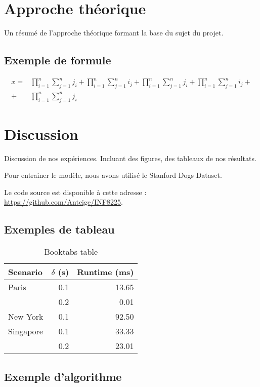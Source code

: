 \documentclass{article}
\begin{document}
\section{Approche théorique}
Un résumé de l'approche théorique formant la base du sujet du projet.

\subsection{Exemple de formule}

\begin{align}
    x =& \prod_{i=1}^n \sum_{j=1}^n j_i + \prod_{i=1}^n \sum_{j=1}^n i_j + \prod_{i=1}^n \sum_{j=1}^n j_i + \prod_{i=1}^n \sum_{j=1}^n i_j + \nonumber\\
    + & \prod_{i=1}^n \sum_{j=1}^n j_i
\end{align}

\section{Discussion}

Discussion de nos expériences. Incluant des figures, des tableaux de nos résultats.

Pour entrainer le modèle, nous avons utilisé le Stanford Dogs Dataset. ~\cite{KhoslaYaoJayadevaprakashFeiFei_FGVC2011}

Le code source est disponible à cette adresse : \url{https://github.com/Anteige/INF8225}.

\subsection{Exemples de tableau}

\begin{table}
\centering
\begin{tabular}{lrr}  
\toprule
Scenario  & $\delta$ (s) & Runtime (ms) \\
\midrule
Paris       & 0.1  & 13.65      \\
            & 0.2  & 0.01       \\
New York    & 0.1  & 92.50      \\
Singapore   & 0.1  & 33.33      \\
            & 0.2  & 23.01      \\
\bottomrule
\end{tabular}
\caption{Booktabs table}
\label{tab:booktabs}
\end{table}

\subsection{Exemple d'algorithme}
\end{document}
